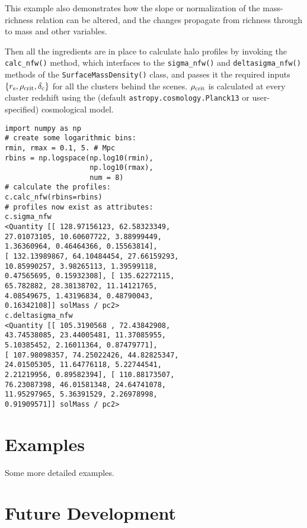 \documentclass{emulateapj}
\newcommand{\code}{\lstinline[style=codeintext]}
\begin{document}
This example also demonstrates how the slope or normalization of the mass-richness relation can be altered, and the changes propagate from richness through to mass and other variables.

Then all the ingredients are in place to calculate halo profiles by invoking the \code{calc_nfw()} method, which interfaces to the \code{sigma_nfw()} and \code{deltasigma_nfw()} methods of the \code{SurfaceMassDensity()} class, and passes it the required inputs $\{ r_{\rm s}, \rho_{\rm crit}, \delta_{\rm c} \}$ for all the clusters behind the scenes. $\rho_{\rm crit}$ is calculated at every cluster redshift using the (default \code{astropy.cosmology.Planck13} or user-specified) cosmological model.
\begin{lstlisting}
import numpy as np
# create some logarithmic bins:
rmin, rmax = 0.1, 5. # Mpc
rbins = np.logspace(np.log10(rmin), 
                    np.log10(rmax), 
                    num = 8)
# calculate the profiles:
c.calc_nfw(rbins=rbins)
# profiles now exist as attributes:
c.sigma_nfw
<Quantity [[ 128.97156123, 62.58323349, 
27.01073105, 10.60607722, 3.88999449, 
1.36360964, 0.46464366, 0.15563814], 
[ 132.13989867, 64.10484454, 27.66159293, 
10.85990257, 3.98265113, 1.39599118, 
0.47565695, 0.15932308], [ 135.62272115, 
65.782882, 28.38138702, 11.14121765, 
4.08549675, 1.43196834, 0.48790043, 
0.16342108]] solMass / pc2>
c.deltasigma_nfw
<Quantity [[ 105.3190568 , 72.43842908, 
43.74538085, 23.44005481, 11.37085955, 
5.10385452, 2.16011364, 0.87479771], 
[ 107.98098357, 74.25022426, 44.82825347, 
24.01505305, 11.64776118, 5.22744541, 
2.21219956, 0.89582394], [ 110.88173507, 
76.23087398, 46.01581348, 24.64741078, 
11.95297965, 5.36391529, 2.26978998, 
0.91909571]] solMass / pc2>
\end{lstlisting}


\section{Examples}
\label{ex}
Some more detailed examples.


\section{Future Development}
\label{future}
\end{document}

